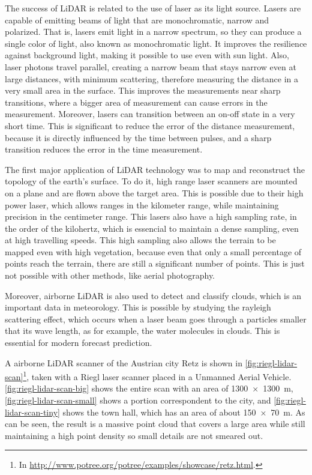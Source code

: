 The success of LiDAR is related to the use of laser as its light source. Lasers are capable of emitting beams of light that are monochromatic, narrow and polarized. That is, lasers emit light in a narrow spectrum, so they can produce a single color of light, also known as monochromatic light. It improves the resilience against background light, making it possible to use even with sun light. Also, laser photons travel parallel, creating a narrow beam that stays narrow even at large distances, with minimum scattering, therefore measuring the distance in a very small area in the surface. This improves the measurements near sharp transitions, where a bigger area of measurement can cause errors in the measurement. Moreover, lasers can transition between an on-off state in a very short time. This is significant to reduce the error of the distance measurement, because it is directly influenced by the time between pulses, and a sharp transition reduces the error in the time measurement. 

The first major application of LiDAR technology was to map and reconstruct the topology of the earth's surface. To do it, high range laser scanners are mounted on a plane and are flown above the target area. This is possible due to their high power laser, which allows ranges in the kilometer range, while maintaining precision in the centimeter range. This lasers also have a high sampling rate, in the order of the kilohertz, which is essencial to maintain a dense sampling, even at high travelling speeds. This high sampling also allows the terrain to be mapped even with high vegetation, because even that only a small percentage of points reach the terrain, there are still a significant number of points. This is just not possible with other methods, like aerial photography. 

Moreover, airborne LiDAR is also used to detect and classify clouds, which is an important data in meteorology. This is possible by studying the rayleigh scattering effect, which occurs when a laser beam goes through a particles smaller that its wave length, as for example, the water molecules in clouds.  This is essential for modern forecast prediction.

A airborne LiDAR scanner of the Austrian city Retz is shown in \cref{fig:riegl-lidar-scan}\footnote{In \url{http://www.potree.org/potree/examples/showcase/retz.html}.}, taken with a Riegl laser scanner placed in a Unmanned Aerial Vehicle. \cref{fig:riegl-lidar-scan-big} shows the entire scan with an area of \SI{1300 x 1300}{\meter}, \cref{fig:riegl-lidar-scan-small} shows a portion correspondent to the city, and \cref{fig:riegl-lidar-scan-tiny} shows the town hall, which has an area of about \SI{150 x 70}{\meter}. As can be seen, the result is a massive point cloud that covers a large area while still maintaining a high point density so small details are not smeared out. 

